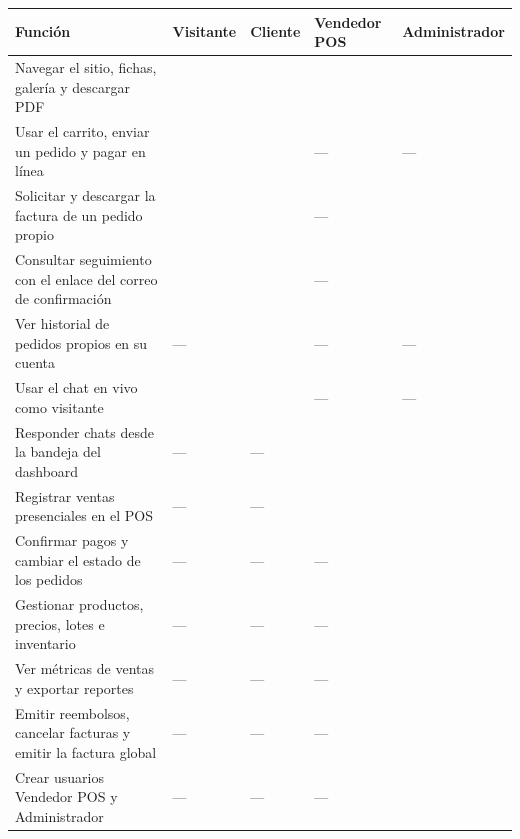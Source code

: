 \documentclass[11pt,letterpaper]{article}
\newcommand{\cmark}{\textcolor{mezcalAgave}{\ding{52}}}
\begin{document}
\renewcommand{\arraystretch}{1.3}
\begin{longtable}{@{} >{\raggedright\arraybackslash}p{6.0cm} >{\centering\arraybackslash}p{1.7cm} >{\centering\arraybackslash}p{1.6cm} >{\centering\arraybackslash}p{1.9cm} >{\centering\arraybackslash}p{2.6cm} @{}}
\toprule
\textbf{Función} & \textbf{Visitante} & \textbf{Cliente} & \textbf{Vendedor POS} & \textbf{Administrador} \\
\midrule
\endhead
\bottomrule
\endfoot
Navegar el sitio, fichas, galería y descargar PDF & \cmark & \cmark & \cmark & \cmark \\
Usar el carrito, enviar un pedido y pagar en línea & \cmark & \cmark & --- & --- \\
Solicitar y descargar la factura de un pedido propio & \cmark & \cmark & --- & \cmark \\
Consultar seguimiento con el enlace del correo de confirmación & \cmark & \cmark & --- & \cmark \\
Ver historial de pedidos propios en su cuenta & --- & \cmark & --- & --- \\
Usar el chat en vivo como visitante & \cmark & \cmark & --- & --- \\
Responder chats desde la bandeja del dashboard & --- & --- & \cmark & \cmark \\
Registrar ventas presenciales en el POS & --- & --- & \cmark & \cmark \\
Confirmar pagos y cambiar el estado de los pedidos & --- & --- & --- & \cmark \\
Gestionar productos, precios, lotes e inventario & --- & --- & --- & \cmark \\
Ver métricas de ventas y exportar reportes & --- & --- & --- & \cmark \\
Emitir reembolsos, cancelar facturas y emitir la factura global & --- & --- & --- & \cmark \\
Crear usuarios Vendedor POS y Administrador & --- & --- & --- & \cmark \\
\end{longtable}
\end{document}
